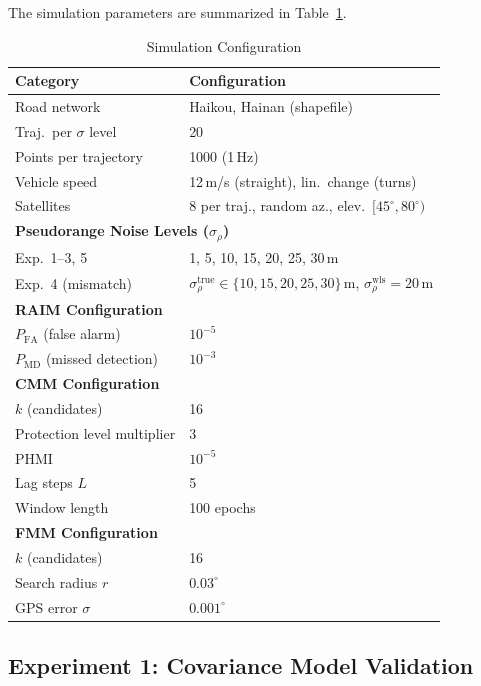 \documentclass[letterpaper,journal]{IEEEtran}
\begin{document}
The simulation parameters are summarized in Table~\ref{tab:mc_setup}.

\begin{table}[htbp]
\centering
\caption{Simulation Configuration}
\label{tab:mc_setup}
\small
\begin{tabular}{lp{}}
\toprule
\textbf{Category} & \textbf{Configuration} \\ \midrule
Road network & Haikou, Hainan (shapefile) \\
Traj.\ per $\sigma$ level & 20 \\
Points per trajectory & 1000 (1\,Hz) \\
Vehicle speed & 12\,m/s (straight), lin.\ change (turns) \\
Satellites & 8 per traj., random az., elev.\ $[45^\circ,80^\circ)$ \\
\midrule
\multicolumn{2}{l}{\textbf{Pseudorange Noise Levels ($\sigma_{\rho}$)}} \\
Exp.~1--3, 5 & 1, 5, 10, 15, 20, 25, 30\,m \\
Exp.~4 (mismatch) & $\sigma_{\rho}^{\text{true}} \in \{10,15,20,25,30\}$\,m,\;
                     $\sigma_{\rho}^{\text{wls}} = 20$\,m \\
\midrule
\multicolumn{2}{l}{\textbf{RAIM Configuration}} \\
$P_{\text{FA}}$ (false alarm) & $10^{-5}$ \\
$P_{\text{MD}}$ (missed detection) & $10^{-3}$ \\
\midrule
\multicolumn{2}{l}{\textbf{CMM Configuration}} \\
$k$ (candidates) & 16 \\
Protection level multiplier & 3 \\
PHMI & $10^{-5}$ \\
Lag steps $L$ & 5 \\
Window length & 100 epochs \\
\midrule
\multicolumn{2}{l}{\textbf{FMM Configuration}} \\
$k$ (candidates) & 16 \\
Search radius $r$ & $0.03^\circ$ \\
GPS error $\sigma$ & $0.001^\circ$ \\
\bottomrule
\end{tabular}
\end{table}

\subsection{Experiment 1: Covariance Model Validation}
\label{sec:exp1}
\end{document}

